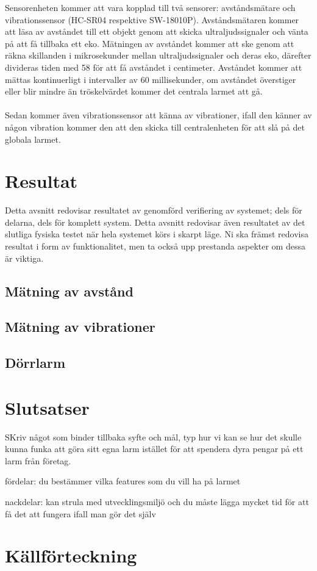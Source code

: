 \documentclass{article}
\begin{document}
Sensorenheten kommer att vara kopplad till två sensorer: avståndsmätare och vibrationssensor (HC-SR04 respektive SW-18010P).
Avståndsmätaren kommer att läsa av avståndet till ett objekt genom att skicka ultraljudssignaler och vänta på att få tillbaka ett eko. 
Mätningen av avståndet kommer att ske genom att räkna skillanden i mikrosekunder mellan ultraljudssignaler och deras eko, därefter divideras tiden med 58 för att få avståndet i centimeter. 
Avståndet kommer att mättas kontinuerligt i intervaller av 60 millisekunder, om avståndet överstiger eller blir mindre än tröskelvärdet kommer det centrala larmet att gå.\\
\\
Sedan kommer även vibrationssensor att känna av vibrationer, ifall den känner av någon vibration kommer den att den skicka till centralenheten för att slå på det globala larmet.



\section{Resultat}
Detta avsnitt redovisar resultatet av genomförd verifiering av systemet; dels för delarna, dels för komplett system. 
Detta avsnitt redovisar även resultatet av det slutliga fysiska testet när hela systemet körs i skarpt läge. 
Ni ska främst redovisa resultat i form av funktionalitet, men ta också upp prestanda aspekter om dessa är viktiga.

\subsection{Mätning av avstånd}

\subsection{Mätning av vibrationer}

\subsection{Dörrlarm}

\section{Slutsatser}
SKriv något som binder tillbaka syfte och mål, typ hur vi kan se hur det skulle kunna funka att göra sitt egna larm istället för att spendera dyra pengar på ett larm från företag.

fördelar: du bestämmer vilka features som du vill ha på larmet

nackdelar: kan strula med utvecklingsmiljö och du måste lägga mycket tid för att få det att fungera ifall man gör det själv

\newpage
\section{Källförteckning}
\printbibliography[heading=none]
\end{document}

